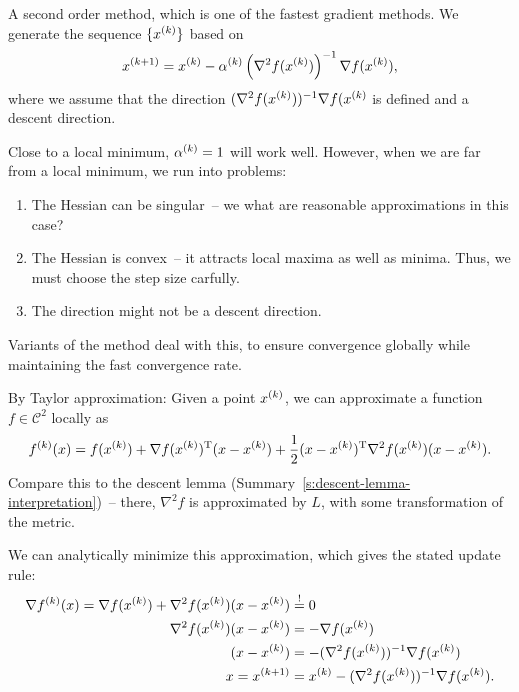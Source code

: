 \documentclass{article}
\begin{document}
A second order method, which is one of the fastest gradient methods.  We generate the sequence
\(\{\kth{x}\}\) based on
\begin{equation*}
  \kth[k+1]{x} = \kth{x} - \kth{\alpha}\left( \nabla^2 f(\kth{x}) \right)^{-1} \nabla f(\kth{x}),
\end{equation*}
where we assume that the direction \((\nabla^2 f(\kth{x}))^{-1} \nabla f(\kth{x}\) is
defined and a descent direction.

Close to a local minimum, \(\kth{\alpha} = 1\) will work well. However, when we are far from a local
minimum, we run into problems:
\begin{enumerate}
\item The Hessian can be singular~-- we what are reasonable approximations in this case?
\item The Hessian is convex~-- it attracts local maxima as well as minima.  Thus, we must choose the
  step size carfully.
\item The direction might not be a descent direction.
\end{enumerate}
Variants of the method deal with this, to ensure convergence globally while maintaining the fast
convergence rate.


\label{s:newton-method-derivation}

By Taylor approximation: Given a point \(\kth{x}\), we can approximate a function
\(f \in \mathcal{C}^2\) locally as
\begin{equation*}
  \kth{f}(x) = f(\kth{x}) + \T{\nabla f(\kth{x})}(x - \kth{x})
  + \frac{1}{2} \T{(x - \kth{x})} \nabla^2 f(\kth{x})(x - \kth{x}).
\end{equation*}
Compare this to the descent lemma (Summary~\ref{s:descent-lemma-interpretation})~-- there,
\(\nabla^2 f\) is approximated by \(L\), with some transformation of the metric.

We can analytically minimize this approximation, which gives the stated update rule:
\begin{align*}
  \nabla \kth{f}(x) = \nabla f(\kth{x}) + \nabla^2 f(\kth{x})(x - \kth{x}) &\overset{!}{=} 0 \\
  \nabla^2 f(\kth{x})(x - \kth{x}) &= -\nabla f(\kth{x}) \\
  (x - \kth{x}) &= -(\nabla^2 f(\kth{x}))^{-1} \nabla f(\kth{x}) \\
  x = \kth[k+1]{x} &= \kth{x} - (\nabla^2 f(\kth{x}))^{-1} \nabla f(\kth{x}).
\end{align*}
\end{document}
